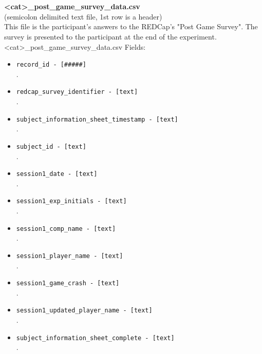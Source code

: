 \begin{description}
\begin{addmargin}[0em]{0em}
    \textbf{\\\\}
    \begin{addmargin}[1em]{0em} %
        \textbf{<cat>\_post\_game\_survey\_data.csv}\\(semicolon delimited text file, 1st row is a header)\\
        This file is the participant's answers to the REDCap's "Post Game Survey".
        The survey is presented to the participant at the end of the experiment.\\ 
        <cat>\_post\_game\_survey\_data.csv Fields:
        \begin{itemize}
            \item \verb|record_id - [#####]|\\.
            \item \verb|redcap_survey_identifier - [text]|\\.
            \item \verb|subject_information_sheet_timestamp - [text]|\\.
            \item \verb|subject_id - [text]|\\.
            \item \verb|session1_date - [text]|\\.
            \item \verb|session1_exp_initials - [text]|\\.
            \item \verb|session1_comp_name - [text]|\\.
            \item \verb|session1_player_name - [text]|\\.
            \item \verb|session1_game_crash - [text]|\\.
            \item \verb|session1_updated_player_name - [text]|\\.
            \item \verb|subject_information_sheet_complete - [text]|\\.

\end{itemize}
\end{addmargin}
\end{addmargin}
\end{description}
